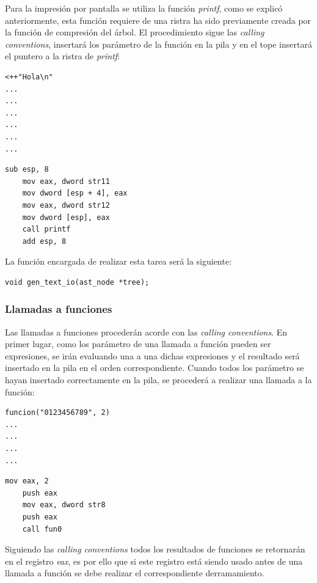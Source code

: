 \documentclass[a4paper,10pt]{article}
\begin{document}
Para la impresión por pantalla se utiliza la función \textit{printf}, como se explicó anteriormente, esta función requiere de una ristra ha sido previamente creada por la función de compresión del árbol. El procedimiento sigue las \emph{calling conventions}, insertará los parámetro de la función en la pila y en el tope insertará el puntero a la ristra de \textit{printf}:
\begin{multicols}{2}
\begin{lstlisting}[language=jam,frame=single]
<++"Hola\n"
...
...
...
...
...
...
\end{lstlisting}
\begin{lstlisting}[frame=single]
	sub esp, 8
	mov eax, dword str11
	mov dword [esp + 4], eax
	mov eax, dword str12
	mov dword [esp], eax
	call printf
	add esp, 8
\end{lstlisting}
\end{multicols}

\noindent La función encargada de realizar esta tarea será la siguiente:

\begin{lstlisting}
void gen_text_io(ast_node *tree);
\end{lstlisting}
\subsubsection{Llamadas a funciones}

Las llamadas a funciones procederán acorde con las \emph{calling conventions}. En primer lugar, como los parámetro de una llamada a función pueden ser expresiones, se irán evaluando una a una dichas expresiones y el resultado será insertado en la pila en el orden correspondiente. Cuando todos los parámetro se hayan insertado correctamente en la pila, se procederá a realizar una llamada a la función:
\begin{multicols}{2}
\begin{lstlisting}[language=jam,frame=single]
funcion("0123456789", 2)
...
...
...
...
\end{lstlisting}
\begin{lstlisting}[frame=single]
	mov eax, 2
	push eax
	mov eax, dword str8
	push eax
	call fun0
\end{lstlisting}
\end{multicols}

Siguiendo las \emph{calling conventions} todos los resultados de funciones se retornarán en el registro \textit{eax}, es por ello que si este registro está siendo usado antes de una llamada a función se debe realizar el correspondiente derramamiento.
\end{document}
